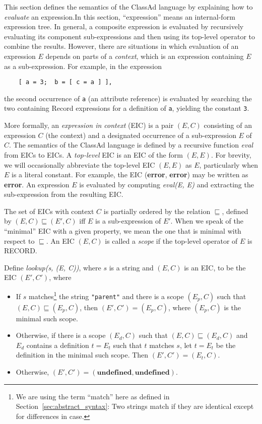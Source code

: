 \documentclass{article}
\begin{document}
This section defines the semantics of the ClassAd language by explaining how
to \emph{evaluate} an expression.{In this section, ``expression'' means an
internal-form expression tree.}
In general, a composite expression is evaluated by recursively evaluating its
component sub-expressions and then using its top-level operator to combine the
results.
However, there are situations in which evaluation of an expression $E$ depends
on parts of a \emph{context}, which is an expression containing $E$ as a
sub-expression.
For example, in the expression
\begin{verbatim}
    [ a = 3;  b = [ c = a ] ],
\end{verbatim}
the second occurrence of \verb/a/ (an attribute reference) is evaluated by
searching the two containing Record expressions for a definition of \verb/a/,
yielding the constant \verb/3/.

More formally, an \emph{expression in context} (EIC) is a pair $(E, C)$
consisting of an expression $C$ (the context) and a designated occurrence of
a sub-expression $E$ of $C$.
The semantics of the ClassAd language is defined by a recursive function
\emph{eval} from EICs to EICs.
A \emph{top-level} EIC is an EIC of the form $(E, E)$.
For brevity, we will occasionally abbreviate the top-level EIC $(E, E)$ as $E$,
particularly when $E$ is a literal constant.
For example, the EIC (\textbf{error}, \textbf{error}) may be written as
\textbf{error}.
An expression $E$ is evaluated by computing \emph{eval(E, E)} and extracting
the sub-expression from the resulting EIC.

The set of EICs with context $C$ is partially ordered by the relation
$\sqsubseteq$, defined by $(E, C) \sqsubseteq (E', C)$ iff $E$ is a
sub-expression of $E'$.
When we speak of the ``minimal'' EIC with a given property, we mean the 
one that is minimal with respect to $\sqsubseteq$.
An EIC $(E, C)$ is called a \emph{scope} if the top-level operator of $E$
is RECORD.

Define \emph{lookup(s, (E, C))}, where $s$ is a string and $(E, C)$ is an
EIC, to be the EIC $(E', C')$, where
\begin{itemize}
\item
If $s$ matches\footnote{We are using the term ``match'' here as defined in
    Section~\ref{sec:abstract_syntax}:  Two strings match if they are identical
    except for differences in case.}
the string \verb/"parent"/ and
there is a scope $(E_p, C)$ such that $(E, C) \sqsubseteq (E_p, C)$,
then $(E', C') = (E_p, C)$, where $(E_p, C)$ is the minimal such scope.
\item
Otherwise, if
there is a scope $(E_d, C)$ such that $(E, C) \sqsubseteq (E_d, C)$
and $E_d$ contains a definition $t = E_t$
such that $t$ matches $s$,
let $t = E_t$ be the definition in the minimal such scope.
Then $(E', C') = (E_t, C)$.
\item
Otherwise, $(E', C') = (\mathbf{undefined}, \mathbf{undefined})$.
\end{itemize}
\end{document}
